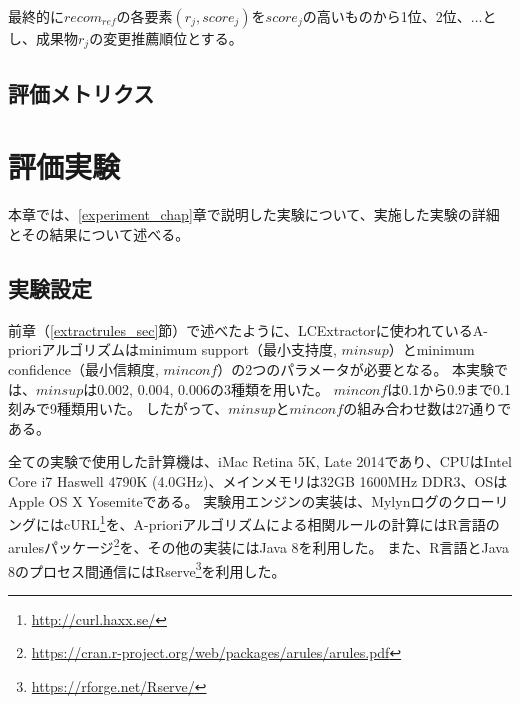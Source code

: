 \documentclass[a4paper]{jsbook}
\newcommand{\minconf}{mincon\!f}
\begin{document}
最終的に$recom_{ref}$の各要素$(r_j,score_j)$を$score_j$の高いものから1位、2位、$\dots$とし、成果物$r_j$の変更推薦順位とする。


\section{評価メトリクス}\label{metrics_sec}
\chapter{評価実験}\label{result_chap}
本章では、\ref{experiment_chap}章で説明した実験について、実施した実験の詳細とその結果について述べる。

\section{実験設定}\label{setting_sec}
前章（\ref{extractrules_sec}節）で述べたように、LCExtractorに使われているA-prioriアルゴリズムはminimum support（最小支持度, $minsup$）とminimum confidence（最小信頼度, $\minconf$）の2つのパラメータが必要となる。
本実験では、$minsup$は0.002, 0.004, 0.006の3種類を用いた。
$\minconf$は0.1から0.9まで0.1刻みで9種類用いた。
したがって、$minsup$と$\minconf$の組み合わせ数は27通りである。

全ての実験で使用した計算機は、iMac Retina 5K, Late 2014であり、CPUはIntel Core i7 Haswell 4790K (4.0GHz)、メインメモリは32GB 1600MHz DDR3、OSはApple OS X Yosemiteである。
実験用エンジンの実装は、MylynログのクローリングにはcURL\footnote{\url{http://curl.haxx.se/}}を、A-prioriアルゴリズムによる相関ルールの計算にはR言語のarulesパッケージ\footnote{\url{https://cran.r-project.org/web/packages/arules/arules.pdf}}を、その他の実装にはJava 8を利用した。
また、R言語とJava 8のプロセス間通信にはRserve\footnote{\url{https://rforge.net/Rserve/}}を利用した。
\end{document}
